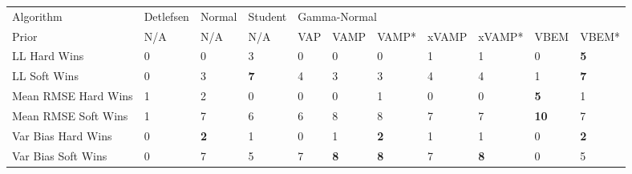 \begin{tabular}{lllllllllll}
\toprule
Algorithm & Detlefsen &      Normal &     Student & \multicolumn{7}{l}{Gamma-Normal} \\
Prior &       N/A &         N/A &         N/A &          VAP &        VAMP &       VAMP* & xVAMP &      xVAMP* &         VBEM &       VBEM* \\
\midrule
LL Hard Wins        &         0 &           0 &           3 &            0 &           0 &           0 &     1 &           1 &            0 &  \textbf{5} \\
LL Soft Wins        &         0 &           3 &  \textbf{7} &            4 &           3 &           3 &     4 &           4 &            1 &  \textbf{7} \\
Mean RMSE Hard Wins &         1 &           2 &           0 &            0 &           0 &           1 &     0 &           0 &   \textbf{5} &           1 \\
Mean RMSE Soft Wins &         1 &           7 &           6 &            6 &           8 &           8 &     7 &           7 &  \textbf{10} &           7 \\
Var Bias Hard Wins  &         0 &  \textbf{2} &           1 &            0 &           1 &  \textbf{2} &     1 &           1 &            0 &  \textbf{2} \\
Var Bias Soft Wins  &         0 &           7 &           5 &            7 &  \textbf{8} &  \textbf{8} &     7 &  \textbf{8} &            0 &           5 \\
\bottomrule
\end{tabular}

